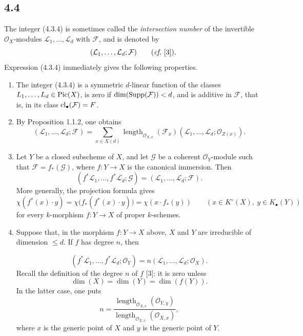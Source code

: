 \subsection*{4.4}
The integer (4.3.4) is sometimes called the \emph{intersection number} of the
invertible $\mathcal O_X$-modules $\mathcal L_1,\ldots,\mathcal L_d$ with
$\mathcal F$, and is denoted by
\[
(\mathcal L_1,\ldots,\mathcal L_d;\mathcal F)
\qquad(\emph{cf.}~[3]).
\]
Expression (4.3.4) immediately gives the following properties.

\begin{enumerate}[label=\arabic*)]
\item The integer (4.3.4) is a symmetric $d$-linear function of
  the classes $L_1,\ldots,L_d\in\operatorname{Pic}(X)$, is zero if
  $\dim(\operatorname{Supp}(\mathcal F))<d$, and is additive in $\mathcal F$, that is, in
  its class $\operatorname{cl}_\bullet(\mathcal F)=F$.

\item By Proposition 1.1.2, one obtains
\begin{equation}\tag{4.4.1}
(\mathcal L_1,\ldots,\mathcal L_d;\mathcal F)=
\sum_{x\in X(d)}
\operatorname{length}_{\mathcal O_{X,x}}(\mathcal F_x)
(\mathcal L_1,\ldots,\mathcal L_d;\mathcal O_{Z(x)}).
\end{equation}

\item Let $Y$ be a closed subscheme of $X$, and let $\mathcal G$ be a coherent
  $\mathcal O_Y$-module such that $\mathcal F=f_*(\mathcal G)$, where
  $f:Y\to X$ is the
  canonical immersion. Then
\[
(f^*\mathcal L_1,\ldots,f^*\mathcal L_d;\mathcal G)
=(\mathcal L_1,\ldots,\mathcal L_d;\mathcal F).
\]
More generally, the projection formula gives
\begin{equation}\tag{4.4.2}
\chi(f^*(x)\cdot y)
=\chi\bigl(f_*(f^*(x)\cdot y)\bigr)
=\chi(x\cdot f_*(y))
\qquad(x\in K^\circ(X),\ y\in K_\bullet(Y))
\end{equation}
for every $k$-morphism $f:Y\to X$ of proper $k$-schemes.

\item Suppose that, in the morphism $f:Y\to X$ above, $X$ and $Y$ are
  irreducible of dimension $\leq d$. If $f$ has degree $n$, then

\begin{equation}\tag{4.4.3}
(f^*\mathcal L_1,\ldots,f^*\mathcal L_d;\mathcal O_Y)
=n(\mathcal L_1,\ldots,\mathcal L_d;\mathcal O_X).
\end{equation}
Recall the definition of the degree $n$ of $f$ [3]: it is zero unless
\[
\dim(X)=\dim(Y)=\dim(f(Y)).
\]
In the latter case, one puts
\begin{equation}\tag{4.4.4}
n=
\frac{\operatorname{length}_{\mathcal O_{X,x}}(\mathcal O_{Y,y})}
{\operatorname{length}_{\mathcal O_{X,x}}(\mathcal O_{X,x})},
\end{equation}
where $x$ is the generic point of $X$ and $y$ is the generic point of $Y$.
\end{enumerate}

